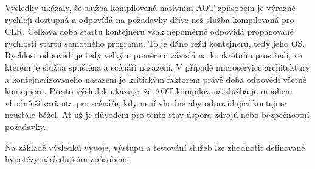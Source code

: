 Výsledky ukázaly, že služba kompilovaná nativním AOT způsobem je výrazně rychleji dostupná a odpovídá na požadavky dříve než služba kompilovaná pro CLR. Celková doba startu kontejneru však nepoměrně odpovídá propagované rychlosti startu samotného programu. To je dáno režií kontejneru, tedy jeho OS. Rychlost odpovědi je tedy velkým poměrem závislá na konkrétním prostředí, ve kterém je služba spuštěna a scénáři nasazení. V případě microservice architektury a kontejnerizovaného nasazení je kritickým faktorem právě doba odpovědi včetně kontejneru. Přesto výsledek ukazuje, že AOT kompilovaná služba je mnohem vhodnější varianta pro scénáře, kdy není vhodné aby odpovídající kontejner neustále běžel. Ať už je důvodem pro tento stav úspora zdrojů nebo bezpečnostní požadavky.


Na základě výsledků vývoje, výstupu a testování služeb lze zhodnotit definované hypotézy následujícím způsobem:

